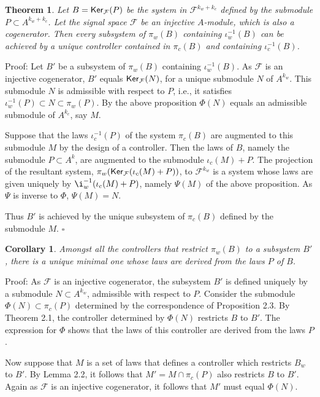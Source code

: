 \documentclass[11pt]{amsart}
\newtheorem{theorem}{Theorem}[section]
\newtheorem{corollary}{Corollary}[section]
\def\ker{\mathop{\sf Ker}}
\newcommand{\F}{\mathcal{F}}
\begin{document}
{\begin{theorem}Let $B = \ker_\F(P)$ be the system in $\F^{k_w+k_c}$ defined by the submodule $P \subset A^{k_w+k_c}$. Let the signal space $\F$ be an injective $A$-module, which is also a cogenerator. Then every subsystem of $\pi_w(B)$ containing $\iota_w^{-1}(B)$ can be achieved by a unique controller contained in $\pi_c(B)$ and containing $\iota_c^{-1}(B)$.
\end{theorem}
\noindent Proof: Let $B'$ be a subsystem of $\pi_w(B)$ containing $\iota_w^{-1}(B)$. As $\F$ is an injective cogenerator, $B'$ equals $\ker_\F(N)$, for a unique submodule $N$ of $A^{k_w}$. This submodule $N$ is admissible with respect to $P$, i.e., it satisfies $\iota_w^{-1}(P) \subset N \subset \pi_w(P)$. By the above proposition $\Phi(N)$ equals an admissible submodule of $A^{k_c}$, say $M$.

Suppose that the laws $\iota_c^{-1}(P)$ of the system $\pi_c(B)$ are augmented to this submodule $M$ by the design of a controller. Then the laws of $B$, namely the submodule $P \subset A^k$, are augmented to the submodule $\iota_c(M) + P$. The projection of the resultant system, $\pi_w(\ker_\F(\iota_c(M) + P))$, to $\F^{k_w}$ is a system whose laws are given uniquely by $\i_w^{-1}(\iota_c(M) + P)$, namely $\Psi(M)$ of the above proposition. As $\Psi$ is inverse to $\Phi$, $\Psi(M) = N$.

Thus $B'$ is achieved by the unique subsystem of $\pi_c(B)$ defined by the submodule $M$. \hspace*{\fill}$\square$

\begin{corollary} Amongst all the controllers that restrict $\pi_w(B)$ to a subsystem $B'$, there is a unique minimal one whose laws are derived from the laws $P$ of $B$.
\end{corollary}
\noindent Proof: As $\F$ is an injective cogenerator, the subsystem $B'$ is defined uniquely by a submodule $N \subset A^{k_w}$, admissible with respect to $P$. Consider the submodule $\Phi(N) \subset \pi_c(P)$ determined by the correspondence of Proposition 2.3. By Theorem 2.1, the controller determined by $\Phi(N)$ restricts $B$ to $B'$. The expression for $\Phi$ shows that the laws of this controller are derived from the laws $P$.

Now suppose that $M$ is a set of laws that defines a controller which restricts $B_w$ to $B'$. By Lemma 2.2, it follows that $M' = M \cap \pi_c(P)$ also restricts $B$ to $B'$. Again as $\F$ is an injective cogenerator, it follows that $M'$ must equal $\Phi(N)$.

}
\end{document}
